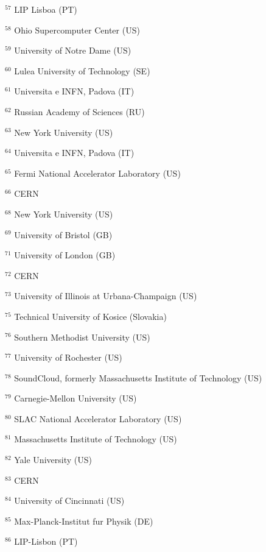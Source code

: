 \par {\footnotesize $^{57}$ LIP Lisboa (PT)}
\par {\footnotesize $^{58}$ Ohio Supercomputer Center (US)}
\par {\footnotesize $^{59}$ University of Notre Dame (US)}
\par {\footnotesize $^{60}$ Lulea University of Technology (SE)}
\par {\footnotesize $^{61}$ Universita e INFN, Padova (IT)}
\par {\footnotesize $^{62}$ Russian Academy of Sciences (RU)}
\par {\footnotesize $^{63}$ New York University (US)}
\par {\footnotesize $^{64}$ Universita e INFN, Padova (IT)}
\par {\footnotesize $^{65}$ Fermi National Accelerator Laboratory (US)}
\par {\footnotesize $^{66}$ CERN}
\par {\footnotesize $^{68}$ New York University (US)}
\par {\footnotesize $^{69}$ University of Bristol (GB)}
\par {\footnotesize $^{71}$ University of London (GB)}
\par {\footnotesize $^{72}$ CERN}
\par {\footnotesize $^{73}$ University of Illinois at Urbana-Champaign (US)}
\par {\footnotesize $^{75}$ Technical University of Kosice (Slovakia)}
\par {\footnotesize $^{76}$ Southern Methodist University (US)}
\par {\footnotesize $^{77}$  University of Rochester (US)}
\par {\footnotesize $^{78}$ SoundCloud, formerly Massachusetts Institute of Technology (US)}
\par {\footnotesize $^{79}$ Carnegie-Mellon University (US)}
\par {\footnotesize $^{80}$ SLAC National Accelerator Laboratory (US)}
\par {\footnotesize $^{81}$ Massachusetts Institute of Technology (US)}
\par {\footnotesize $^{82}$ Yale University (US)}
\par {\footnotesize $^{83}$ CERN}
\par {\footnotesize $^{84}$ University of Cincinnati (US)}
\par {\footnotesize $^{85}$ Max-Planck-Institut fur Physik (DE)}
\par {\footnotesize $^{86}$ LIP-Lisbon (PT)}
